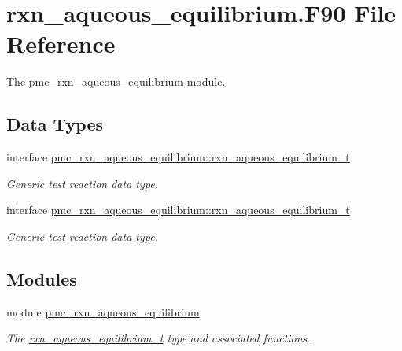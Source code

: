 \hypertarget{rxn__aqueous__equilibrium_8_f90}{}\section{rxn\+\_\+aqueous\+\_\+equilibrium.\+F90 File Reference}
\label{rxn__aqueous__equilibrium_8_f90}


The \mbox{\hyperlink{namespacepmc__rxn__aqueous__equilibrium}{pmc\+\_\+rxn\+\_\+aqueous\+\_\+equilibrium}} module.  


\subsection*{Data Types}
\begin{DoxyCompactItemize}
\item 
interface \mbox{\hyperlink{structpmc__rxn__aqueous__equilibrium_1_1rxn__aqueous__equilibrium__t}{pmc\+\_\+rxn\+\_\+aqueous\+\_\+equilibrium\+::rxn\+\_\+aqueous\+\_\+equilibrium\+\_\+t}}
\begin{DoxyCompactList}\small\item\em Generic test reaction data type. \end{DoxyCompactList}\item 
interface \mbox{\hyperlink{structpmc__rxn__aqueous__equilibrium_1_1rxn__aqueous__equilibrium__t}{pmc\+\_\+rxn\+\_\+aqueous\+\_\+equilibrium\+::rxn\+\_\+aqueous\+\_\+equilibrium\+\_\+t}}
\begin{DoxyCompactList}\small\item\em Generic test reaction data type. \end{DoxyCompactList}\end{DoxyCompactItemize}
\subsection*{Modules}
\begin{DoxyCompactItemize}
\item 
module \mbox{\hyperlink{namespacepmc__rxn__aqueous__equilibrium}{pmc\+\_\+rxn\+\_\+aqueous\+\_\+equilibrium}}
\begin{DoxyCompactList}\small\item\em The \mbox{\hyperlink{structpmc__rxn__aqueous__equilibrium_1_1rxn__aqueous__equilibrium__t}{rxn\+\_\+aqueous\+\_\+equilibrium\+\_\+t}} type and associated functions. \end{DoxyCompactList}\end{DoxyCompactItemize}

